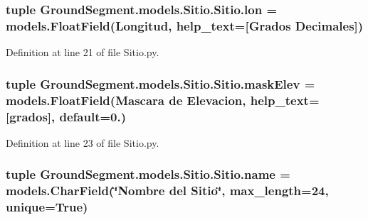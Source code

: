 \subsubsection[{lon}]{\setlength{\rightskip}{0pt plus 5cm}tuple Ground\+Segment.\+models.\+Sitio.\+Sitio.\+lon = models.\+Float\+Field(\textquotesingle{}Longitud\textquotesingle{}, help\+\_\+text=\textquotesingle{}\mbox{[}Grados Decimales\mbox{]}\textquotesingle{})\hspace{0.3cm}{\ttfamily [static]}}\label{class_ground_segment_1_1models_1_1_sitio_1_1_sitio_a58939f0d8d5fff5d4807f745c6ba3335}


Definition at line 21 of file Sitio.\+py.

\hypertarget{class_ground_segment_1_1models_1_1_sitio_1_1_sitio_ae26c1d2a62cbe1a3dcae871012c0d5bd}{}
\subsubsection[{mask\+Elev}]{\setlength{\rightskip}{0pt plus 5cm}tuple Ground\+Segment.\+models.\+Sitio.\+Sitio.\+mask\+Elev = models.\+Float\+Field(\textquotesingle{}Mascara de Elevacion\textquotesingle{}, help\+\_\+text=\textquotesingle{}\mbox{[}grados\mbox{]}\textquotesingle{}, default=0.)\hspace{0.3cm}{\ttfamily [static]}}\label{class_ground_segment_1_1models_1_1_sitio_1_1_sitio_ae26c1d2a62cbe1a3dcae871012c0d5bd}


Definition at line 23 of file Sitio.\+py.

\hypertarget{class_ground_segment_1_1models_1_1_sitio_1_1_sitio_ad9bfe4bfea9a9a600a9cf0a17dfe2abf}{}
\subsubsection[{name}]{\setlength{\rightskip}{0pt plus 5cm}tuple Ground\+Segment.\+models.\+Sitio.\+Sitio.\+name = models.\+Char\+Field(\char`\"{}Nombre del {\bf Sitio}\char`\"{}, max\+\_\+length=24, unique=True)\hspace{0.3cm}{\ttfamily [static]}}\label{class_ground_segment_1_1models_1_1_sitio_1_1_sitio_ad9bfe4bfea9a9a600a9cf0a17dfe2abf}


